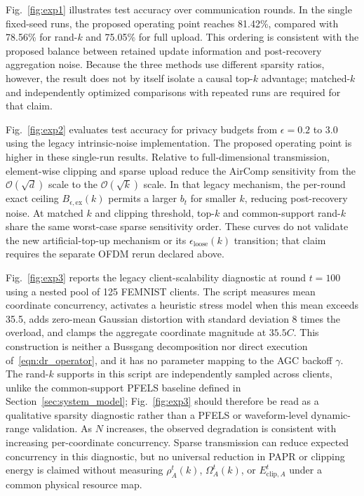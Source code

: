 \documentclass[journal]{IEEEtran}
\newcommand{\rev}[1]{{\color{revisionred}#1}}
\begin{document}
Fig.~\ref{fig:exp1} illustrates test accuracy over communication rounds. In the single fixed-seed runs, the proposed operating point reaches 81.42\%, compared with 78.56\% for rand-$k$ and 75.05\% for full upload. This ordering is consistent with the proposed balance between retained update information and post-recovery aggregation noise. Because the three methods use different sparsity ratios, however, the result does not by itself isolate a causal top-$k$ advantage; matched-$k$ and independently optimized comparisons with repeated runs are required for that claim.

Fig.~\ref{fig:exp2} evaluates test accuracy for privacy budgets from $\epsilon=0.2$ to $3.0$ using the legacy intrinsic-noise implementation. The proposed operating point is higher in these single-run results. \rev{Relative to full-dimensional transmission, element-wise clipping and sparse upload reduce the AirComp sensitivity from the $\mathcal{O}(\sqrt{d})$ scale to the $\mathcal{O}(\sqrt{k})$ scale.} In that legacy mechanism, the per-round exact ceiling $B_{\epsilon,\mathrm{ex}}(k)$ permits a larger $b_t$ for smaller $k$, reducing post-recovery noise. \rev{At matched $k$ and clipping threshold, top-$k$ and common-support rand-$k$ share the same worst-case sparse sensitivity order.} These curves do not validate the new artificial-top-up mechanism or its $\epsilon_{\mathrm{loose}}(k)$ transition; that claim requires the separate OFDM rerun declared above.

Fig.~\ref{fig:exp3} reports the legacy client-scalability diagnostic at round $t=100$ using a nested pool of 125 FEMNIST clients. The script measures mean coordinate concurrency, activates a heuristic stress model when this mean exceeds 35.5, adds zero-mean Gaussian distortion with standard deviation $8$ times the overload, and clamps the aggregate coordinate magnitude at $35.5C$. This construction is neither a Bussgang decomposition nor direct execution of~\eqref{eqn:dr_operator}, and it has no parameter mapping to the AGC backoff $\gamma$. The rand-$k$ supports in this script are independently sampled across clients, unlike the common-support PFELS baseline defined in Section~\ref{sec:system_model}; Fig.~\ref{fig:exp3} should therefore be read as a qualitative sparsity diagnostic rather than a PFELS or waveform-level dynamic-range validation. As $N$ increases, the observed degradation is consistent with increasing per-coordinate concurrency. Sparse transmission can reduce expected concurrency in this diagnostic, but no universal reduction in PAPR or clipping energy is claimed without measuring $\rho_A^t(k)$, $\Omega_A^t(k)$, or $E_{\mathrm{clip},A}^t$ under a common physical resource map.
\end{document}
